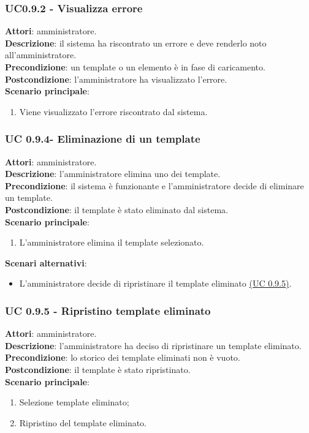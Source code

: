 \subsubsection{UC0.9.2 - Visualizza errore}{
	\label{uc0.9.2}
	\textbf{Attori}: amministratore. \\
	\textbf{Descrizione}: il sistema ha riscontrato un errore e deve renderlo noto all'amministratore. \\
	\textbf{Precondizione}: un template o un elemento è in fase di caricamento.	\\
	\textbf{Postcondizione}: l'amministratore ha visualizzato l'errore.	\\
	\textbf{Scenario principale}:
	\begin{enumerate}
		\item Viene visualizzato l'errore riscontrato dal sistema.
	\end{enumerate}
	}
\subsubsection{UC 0.9.4- Eliminazione di un template}{
	\label{uc0.9.4}
	\textbf{Attori}: amministratore. \\
	\textbf{Descrizione}: l'amministratore elimina uno dei template. \\
	\textbf{Precondizione}: il sistema è funzionante e l'amministratore decide di eliminare un template.	\\
	\textbf{Postcondizione}: il template è stato eliminato dal sistema.	\\
	\textbf{Scenario principale}:
	\begin{enumerate}
		\item L’amministratore elimina il template selezionato.
	\end{enumerate}
	\textbf{Scenari alternativi}:
	\begin{itemize}
		\item L'amministratore decide di ripristinare il template eliminato \hyperref[uc0.9.5]{(UC 0.9.5)}.
	\end{itemize}
	}
\subsubsection{UC 0.9.5 - Ripristino template eliminato}{
	\label{uc0.9.5}
	\textbf{Attori}: amministratore. \\
	\textbf{Descrizione}: l'amministratore ha deciso di ripristinare un template eliminato. \\
	\textbf{Precondizione}: lo storico dei template eliminati non è vuoto.	\\
	\textbf{Postcondizione}: il template è stato ripristinato.	\\
	\textbf{Scenario principale}:
	\begin{enumerate}
		\item Selezione template eliminato; 
		\item Ripristino del template eliminato.
	\end{enumerate}
	}